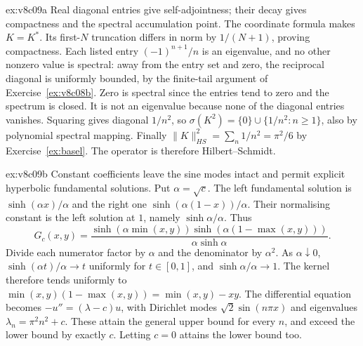 \begin{solution}{ex:v8c09a}
\idea Real diagonal entries give self-adjointness; their decay gives compactness and the spectral accumulation point.
\writeup The coordinate formula makes $K=K^*$. Its first-$N$ truncation differs in norm by $1/(N+1)$, proving compactness. Each listed entry $(-1)^{n+1}/n$ is an eigenvalue, and no other nonzero value is spectral: away from the entry set and zero, the reciprocal diagonal is uniformly bounded, by the finite-tail argument of Exercise~\ref{ex:v8c08b}. Zero is spectral since the entries tend to zero and the spectrum is closed. It is not an eigenvalue because none of the diagonal entries vanishes.
Squaring gives diagonal $1/n^2$, so $\sigma(K^2)=\{0\}\cup\{1/n^2:n\ge1\}$, also by polynomial spectral mapping. Finally $\|K\|_{HS}^2=\sum_n1/n^2=\pi^2/6$ by Exercise~\ref{ex:basel}. The operator is therefore Hilbert--Schmidt.
\end{solution}

\begin{solution}{ex:v8c09b}
\idea Constant coefficients leave the sine modes intact and permit explicit hyperbolic fundamental solutions.
\writeup Put $\alpha=\sqrt c$. The left fundamental solution is $\sinh(\alpha x)/\alpha$ and the right one $\sinh(\alpha(1-x))/\alpha$. Their normalising constant is the left solution at $1$, namely $\sinh\alpha/\alpha$. Thus
\[
G_c(x,y)=\frac{\sinh(\alpha\min(x,y))\sinh(\alpha(1-\max(x,y)))}{\alpha\sinh\alpha}.
\]
Divide each numerator factor by $\alpha$ and the denominator by $\alpha^2$. As $\alpha\downarrow0$, $\sinh(\alpha t)/\alpha\to t$ uniformly for $t\in[0,1]$, and $\sinh\alpha/\alpha\to1$. The kernel therefore tends uniformly to $\min(x,y)(1-\max(x,y))=\min(x,y)-xy$.
The differential equation becomes $-u''=(\lambda-c)u$, with Dirichlet modes $\sqrt2\sin(n\pi x)$ and eigenvalues $\lambda_n=\pi^2n^2+c$. These attain the general upper bound for every $n$, and exceed the lower bound by exactly $c$. Letting $c=0$ attains the lower bound too.
\end{solution}

